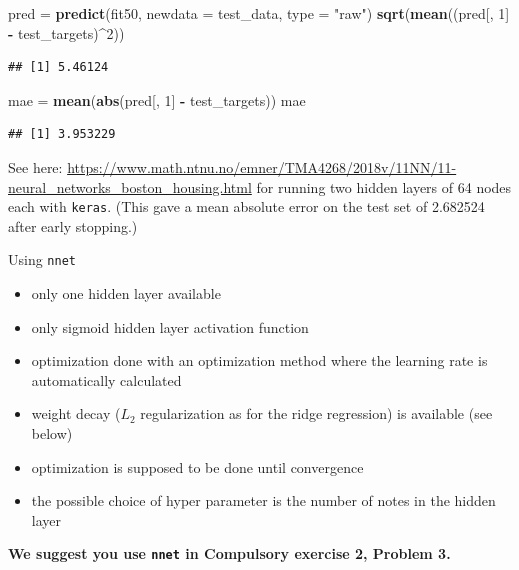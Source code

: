 \documentclass[10pt,ignorenonframetext,]{beamer}
\newenvironment{Shaded}{\begin{snugshade}}{\end{snugshade}}
\newcommand{\DataTypeTok}[1]{\textcolor[rgb]{0.13,0.29,0.53}{#1}}
\newcommand{\DecValTok}[1]{\textcolor[rgb]{0.00,0.00,0.81}{#1}}
\newcommand{\KeywordTok}[1]{\textcolor[rgb]{0.13,0.29,0.53}{\textbf{#1}}}
\newcommand{\NormalTok}[1]{#1}
\newcommand{\OperatorTok}[1]{\textcolor[rgb]{0.81,0.36,0.00}{\textbf{#1}}}
\newcommand{\StringTok}[1]{\textcolor[rgb]{0.31,0.60,0.02}{#1}}
\providecommand{\tightlist}{%
  \setlength{\itemsep}{0pt}\setlength{\parskip}{0pt}}
\begin{document}
\begin{frame}[fragile]
\begin{Shaded}
\begin{Highlighting}[]
\NormalTok{pred =}\StringTok{ }\KeywordTok{predict}\NormalTok{(fit50, }\DataTypeTok{newdata =}\NormalTok{ test_data, }\DataTypeTok{type =} \StringTok{"raw"}\NormalTok{)}
\KeywordTok{sqrt}\NormalTok{(}\KeywordTok{mean}\NormalTok{((pred[, }\DecValTok{1}\NormalTok{] }\OperatorTok{-}\StringTok{ }\NormalTok{test_targets)}\OperatorTok{^}\DecValTok{2}\NormalTok{))}
\end{Highlighting}
\end{Shaded}

\begin{verbatim}
## [1] 5.46124
\end{verbatim}

\begin{Shaded}
\begin{Highlighting}[]
\NormalTok{mae =}\StringTok{ }\KeywordTok{mean}\NormalTok{(}\KeywordTok{abs}\NormalTok{(pred[, }\DecValTok{1}\NormalTok{] }\OperatorTok{-}\StringTok{ }\NormalTok{test_targets))}
\NormalTok{mae}
\end{Highlighting}
\end{Shaded}

\begin{verbatim}
## [1] 3.953229
\end{verbatim}

\normalsize

See here:
\url{https://www.math.ntnu.no/emner/TMA4268/2018v/11NN/11-neural_networks_boston_housing.html}
for running two hidden layers of 64 nodes each with \texttt{keras}.
(This gave a mean absolute error on the test set of 2.682524 after early
stopping.)

\end{frame}

\begin{frame}[fragile]

\begin{block}{Using \texttt{nnet}}

\begin{itemize}
\tightlist
\item
  only one hidden layer available
\item
  only sigmoid hidden layer activation function
\item
  optimization done with an optimization method where the learning rate
  is automatically calculated
\item
  weight decay (\(L_2\) regularization as for the ridge regression) is
  available (see below)
\item
  optimization is supposed to be done until convergence
\item
  the possible choice of hyper parameter is the number of notes in the
  hidden layer
\end{itemize}

\textbf{We suggest you use \texttt{nnet} in Compulsory exercise 2,
Problem 3.}

\end{block}

\end{frame}
\end{document}
